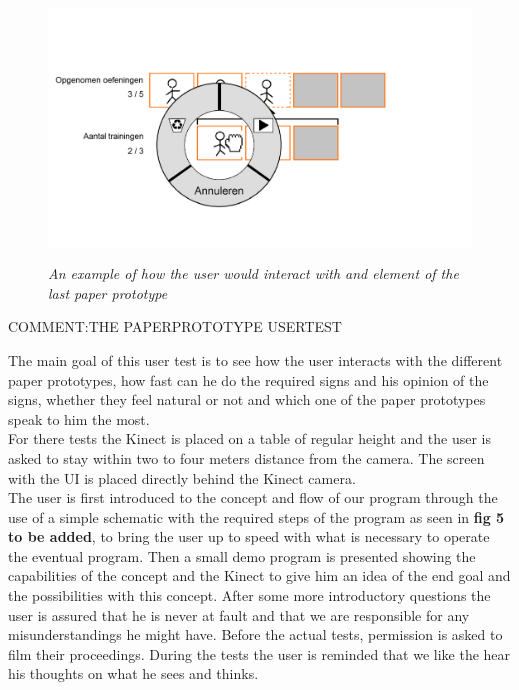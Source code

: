 \begin{figure}[H]
	\begin{center}
		\includegraphics[width=12.5cm, height=7cm]{figures/prototype_10_6_example.png}
		\caption{\emph{An example of how the user would interact with and element of the last paper prototype}}
		\label{example last prototype}
	\end{center}
\end{figure}

{\large COMMENT:THE PAPERPROTOTYPE USERTEST}

The main goal of this user test is to see how the user interacts with the different paper prototypes, how fast can he do the required signs and his opinion of the signs, whether they feel natural or not and which one of the paper prototypes speak to him the most. \\

For there tests the Kinect is placed on a table of regular height and the user is asked to stay within two to four meters distance from the camera. The screen with the UI is placed directly behind the Kinect camera.\\

The user is first introduced to the concept and flow of our program through the use of a simple schematic with the required steps of the program as seen in \textbf{fig 5 to be added}, to bring the user up to speed with what is necessary to operate the eventual program. Then a small demo program is presented showing the capabilities of the concept and the Kinect to give him an idea of the end goal and the possibilities with this concept. After some more introductory questions the user is assured that he is never at fault and that we are responsible for any misunderstandings he might have. Before the actual tests, permission is asked to film their proceedings. During the tests the user is reminded that we like the hear his thoughts on what he sees and thinks.\\

